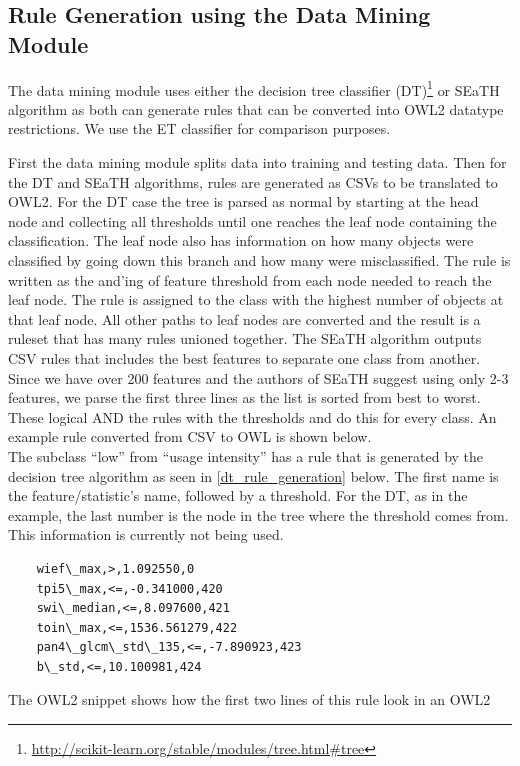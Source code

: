 \documentclass[authoryear, review,12pt,number]{elsarticle}
\begin{document}
\label{subsec_rulegen_data_mining}
\subsection{Rule Generation using the Data Mining Module}
The data mining module uses either the decision tree classifier 
(DT)\footnote{\url{http://scikit-learn.org/stable/modules/tree.html\#tree}} 
\citep{scikit-learn} or SEaTH algorithm \citep{Nussbaum2006} as both can 
generate rules that can be converted into OWL2 datatype restrictions. We use the
ET classifier for comparison purposes.

First the data mining module splits data into training and testing data. 
Then for the DT and SEaTH algorithms, rules are generated as CSVs to be 
translated to OWL2.
For the DT case the tree is parsed as normal by starting at the head node and
collecting all thresholds until one reaches the leaf node containing the
classification. The leaf node also has information on how many objects were
classified by going down this branch and how many were misclassified. The rule
is written as the and'ing of feature threshold from each node needed to reach
the leaf node. The rule is assigned to the class with the highest number of
objects at that leaf node. All other paths to leaf nodes are converted and the
result is a ruleset that has many rules unioned together. The SEaTH algorithm
outputs CSV rules that includes the best features to separate one class from
another. Since we have over 200 features and the authors of SEaTH suggest using
only 2-3 features, we parse the first three lines as the list is sorted from
best to worst. These logical AND the rules with the thresholds and do this for
every class. An example rule converted from CSV to OWL is shown below.
\\
The subclass ``low'' from ``usage intensity'' has a rule that is generated by
the decision tree algorithm as seen in \ref{dt_rule_generation} below. The first
name is the feature/statistic's name, followed by a threshold. For the DT, as in
the example, the last number is the node in the tree where the threshold comes
from. This information is currently not being used.
\label{dt_rule_snippet_csv}
\begin{lstlisting}
    wief\_max,>,1.092550,0
    tpi5\_max,<=,-0.341000,420
    swi\_median,<=,8.097600,421
    toin\_max,<=,1536.561279,422
    pan4\_glcm\_std\_135,<=,-7.890923,423
    b\_std,<=,10.100981,424
\end{lstlisting}
The OWL2 snippet shows how the first two lines of this rule look in an OWL2
\end{document}
